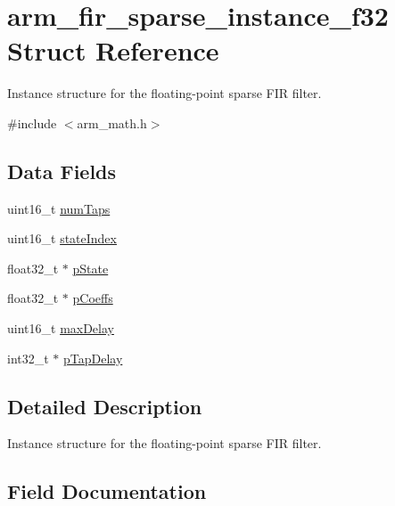 \hypertarget{structarm__fir__sparse__instance__f32}{}\section{arm\+\_\+fir\+\_\+sparse\+\_\+instance\+\_\+f32 Struct Reference}
\label{structarm__fir__sparse__instance__f32}


Instance structure for the floating-\/point sparse F\+IR filter.  




{\ttfamily \#include $<$arm\+\_\+math.\+h$>$}

\subsection*{Data Fields}
\begin{DoxyCompactItemize}
\item 
uint16\+\_\+t \mbox{\hyperlink{structarm__fir__sparse__instance__f32_a751941891e47f522a7f5375fe8990aac}{num\+Taps}}
\item 
uint16\+\_\+t \mbox{\hyperlink{structarm__fir__sparse__instance__f32_a566a0cb53437e48b9a3bf18e5b03d8aa}{state\+Index}}
\item 
float32\+\_\+t $\ast$ \mbox{\hyperlink{structarm__fir__sparse__instance__f32_a335c87e6fdc4b96601d95a5de8b9c463}{p\+State}}
\item 
float32\+\_\+t $\ast$ \mbox{\hyperlink{structarm__fir__sparse__instance__f32_aacbb8dd8eeba4b21fc2bb40076405ee3}{p\+Coeffs}}
\item 
uint16\+\_\+t \mbox{\hyperlink{structarm__fir__sparse__instance__f32_ab25f4ee7550e6d92acff77ada283733f}{max\+Delay}}
\item 
int32\+\_\+t $\ast$ \mbox{\hyperlink{structarm__fir__sparse__instance__f32_adec00b3793ab4f08edfeb4ea6a9eb6e6}{p\+Tap\+Delay}}
\end{DoxyCompactItemize}


\subsection{Detailed Description}
Instance structure for the floating-\/point sparse F\+IR filter. 

\subsection{Field Documentation}
\mbox{\label{structarm__fir__sparse__instance__f32_ab25f4ee7550e6d92acff77ada283733f}} 
